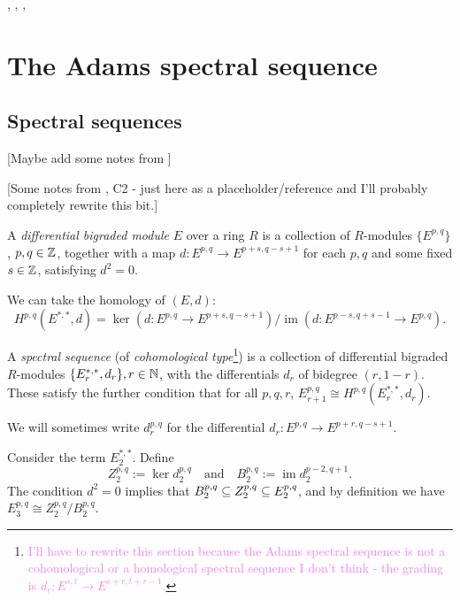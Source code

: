 \documentclass{MetricNotes2023}
\def\subq{\ensuremath\subseteq}
\def\inte{\ensuremath\mathbb{Z}}
\def\nat{\ensuremath\mathbb{N}}
\DeclareMathOperator{\im}{im}
\def\textcolour{\textcolor}
\begin{document}
\autocite{ass}, \autocite{hatcher5}, \autocite{concise}, \autocite{spectra}

\section{The Adams spectral sequence}

\subsection{Spectral sequences}\label{2504041910}

[Maybe add some notes from \autocite{ass}]

[Some notes from \autocite{spectral_sequences}, C2 - just here as a placeholder/reference and I'll probably completely rewrite this bit.]

\begin{definition}
A \textit{differential bigraded module} \(E\) over a ring \(R\) is a collection of \(R\)-modules \(\{E^{p, q}\}\), \(p, q\in \inte\), together with a map \(d : E^{p, q} \to E^{p+s, q-s+1}\) for each \(p, q\) and some fixed \(s \in \inte\), satisfying \(d^2=0\). 
\end{definition}

We can take the homology of \((E, d)\):
\[H^{p, q}(E^{*, *}, d)=\ker(d : E^{p, q}\to E^{p+s, q-s+1})/\im(d : E^{p-s, q+s-1}\to E^{p, q}).\]

\begin{definition}
A \textit{spectral sequence} (of \textit{cohomological type}\footnote{\textcolour{violet}{I'll have to rewrite this section because the Adams spectral sequence is not a cohomological or a homological spectral sequence I don't think - the grading is \(d_r : E^{s,t}\to E^{s+r,t+r-1}\).}}) is a collection of differential bigraded \(R\)-modules \(\{E^{*, *}_r, d_r\}, r \in \nat\), with the differentials \(d_r\) of bidegree \((r, 1-r)\). These satisfy the further condition that for all \(p, q, r\), \(E^{p, q}_{r+1}\cong H^{p, q}(E_r^{*, *}, d_r)\).
\end{definition}

We will sometimes write \(d^{p, q}_r\) for the differential \(d_r : E^{p, q}\to E^{p+r,q-s+1}\). 

Consider the term \(E_2^{*, *}\). Define 
\[Z_2^{p, q}:=\ker d_2^{p,q} \quad \text{and} \quad B_2^{p,q}:=\im d_2^{p-2,q+1}.\]
The condition \(d^2=0\) implies that \(B_2^{p,q}\subq Z_2^{p,q}\subq E_2^{p,q}\), and by definition we have \(E_3^{p,q}\cong Z^{p,q}_2/B_2^{p,q}\). 
\end{document}
